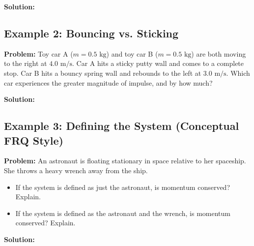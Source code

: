 \documentclass{article}
\begin{document}
\vspace{0.2cm}
\begin{center}
\end{center}

\vspace{0.2cm}
\textbf{Solution:}

\vspace{5cm}

\subsection*{Example 2: Bouncing vs. Sticking}
\textbf{Problem:} Toy car A ($m = 0.5 \text{ kg}$) and toy car B ($m = 0.5 \text{ kg}$) are both moving to the right at $4.0 \text{ m/s}$. Car A hits a sticky putty wall and comes to a complete stop. Car B hits a bouncy spring wall and rebounds to the left at $3.0 \text{ m/s}$. Which car experiences the greater magnitude of impulse, and by how much?

\textbf{Solution:}

\vspace{4.5cm}

\subsection*{Example 3: Defining the System (Conceptual FRQ Style)}
\textbf{Problem:} An astronaut is floating stationary in space relative to her spaceship. She throws a heavy wrench away from the ship. 
\begin{itemize}
    \item[(a)] If the system is defined as just the astronaut, is momentum conserved? Explain.
    \item[(b)] If the system is defined as the astronaut and the wrench, is momentum conserved? Explain.
\end{itemize}

\textbf{Solution:}

\vspace{3.5cm}
\end{document}
